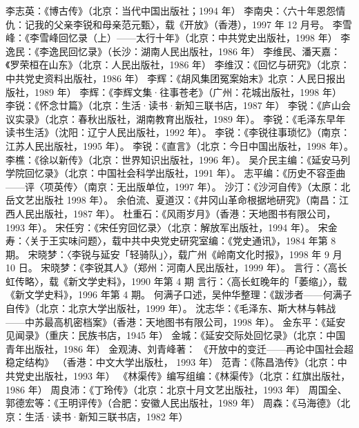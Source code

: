 \begin{thebibliography}{999}
\bibitem{} 李志英：《博古传》（北京：当代中国出版社；1994 年）
\bibitem{} 李南央：〈六十年恩怨情仇：记我的父亲李锐和母亲范元甄〉，载《开放》（香港），1997 年 12 月号。
\bibitem{} 李雪峰：《李雪峰回忆录（上）——太行十年》（北京：中共党史出版社，1998 年）
\bibitem{} 李逸民：《李逸民回忆录》（长沙：湖南人民出版社，1986 年）
\bibitem{} 李维民、潘天嘉：《罗荣桓在山东》（北京：人民出版社，1986 年）
\bibitem{} 李维汉：《回忆与研究》（北京：中共党史资料出版社，1986 年）
\bibitem{} 李辉：《胡风集团冤案始末》北京：人民日报出版社，1989 年）
\bibitem{} 李辉：《李辉文集·往事苍老》（广州：花城出版社，1998 年）
\bibitem{} 李锐：《怀念廿篇》（北京：生活·读书·新知三联书店，1987 年）
\bibitem{} 李锐：《庐山会议实录》（北京：春秋出版社，湖南教育出版社，1989 年）。
\bibitem{} 李锐：《毛泽东早年读书生活》（沈阳：辽宁人民出版社，1992 年）。
\bibitem{} 李锐：《李锐往事琐忆》（南京：江苏人民出版社，1995 年）。
\bibitem{} 李锐：《直言》（北京：今日中国出版社，1998 年）。
\bibitem{} 李樵：《徐以新传》（北京：世界知识出版社，1996 年）。
\bibitem{} 吴介民主编：《延安马列学院回忆录》（北京：中国社会科学出版社，1991 年）。
\bibitem{} 志平编：《历史不容歪曲——评〈项英传〉（南京：无出版单位，1997 年）。
\bibitem{} 沙汀：《沙河自传》（太原：北岳文艺出版社 1998 年）。
\bibitem{} 余伯流、夏道汉：《井冈山革命根据地研究》（南昌：江西人民出版社，1987 年）。
\bibitem{} 杜重石：《风雨岁月》（香港：天地图书有限公司，1993 年）。
\bibitem{} 宋任穷：《宋任穷回忆录〉（北京：解放军出版社，1994 年）。
\bibitem{} 宋金寿：〈关于王实味问题〉，载中共中央党史研究室编：《党史通讯》，1984 年第 8 期。
\bibitem{} 宋晓梦：〈李锐与延安「轻骑队」〉，载广州《岭南文化时报》，1998 年 9 月 10 日。
\bibitem{} 宋晓梦：《李锐其人》（郑州：河南人民出版社，1999 年）。
\bibitem{} 言行：〈高长虹传略〉，载《新文学史料》，1990 年第 4 期
\bibitem{} 言行：〈高长虹晚年的「萎缩」〉，载《新文学史料》，1996 年第 4 期。
\bibitem{} 何满子口述，吴仲华整理：《跋涉者——何满子自传》（北京：北京大学出版社，1999 年）。
\bibitem{} 沈志华：《毛泽东、斯大林与韩战——中苏最高机密档案》（香港：天地图书有限公司，1998 年）。
\bibitem{} 金东平：《延安见闻录》（重庆：民族书店，1945 年）
\bibitem{} 金城：《延安交际处回忆录》（北京：中国青年出版社，1986 年）
\bibitem{} 金观涛、刘青峰著： 《开放中的变迁——再论中国社会超稳定结构》
\bibitem{} （香港：中文大学出版杜， 1993 年）
\bibitem{} 范青：《陈昌浩传》（北京：中共党史出版社，1993 年）
\bibitem{} 《林渠传》编写组编：《林渠传》（北京：红旗出版社，1986 年）
\bibitem{} 周良沛：《丁玲传》（北京：北京十月文艺出版社，1993 年）
\bibitem{} 周国全、郭德宏等：《王明评传》（合肥：安徽人民出版社，1989 年）
\bibitem{} 周森：《马海德》（北京：生活·读书·新知三联书店，1982 年）

\end{thebibliography}
